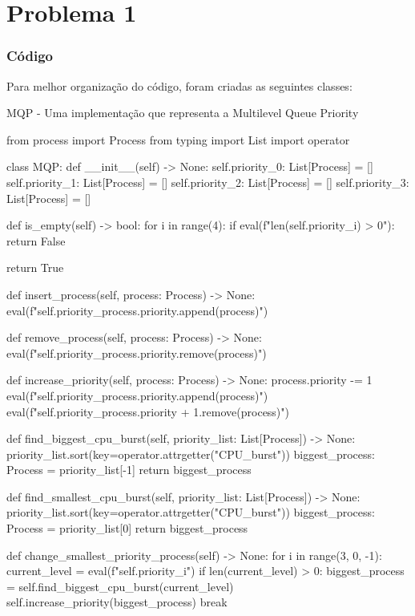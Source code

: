 \chapter{Problema 1}

\subsection*{Código}

Para melhor organização do código, foram criadas as seguintes classes:

MQP - Uma implementação que representa a Multilevel Queue Priority
\begin{python}
    from process import Process
    from typing import List
    import operator

    class MQP:
        def __init__(self) -> None:
            self.priority_0: List[Process] = []
            self.priority_1: List[Process] = []
            self.priority_2: List[Process] = []
            self.priority_3: List[Process] = []
            
        def is_empty(self) -> bool:
            for i in range(4):
                if eval(f"len(self.priority_{i}) > 0"):
                    return False
            
            return True

        
        def insert_process(self, process: Process) -> None:
            eval(f"self.priority_{process.priority}.append(process)")
        

        def remove_process(self, process: Process) -> None:
            eval(f"self.priority_{process.priority}.remove(process)")

        
        def increase_priority(self, process: Process) -> None:
            process.priority -= 1
            eval(f"self.priority_{process.priority}.append(process)")
            eval(f"self.priority_{process.priority + 1}.remove(process)")


        def find_biggest_cpu_burst(self, priority_list: List[Process]) -> None:
            priority_list.sort(key=operator.attrgetter("CPU_burst"))
            biggest_process: Process = priority_list[-1]
            return biggest_process
        
        def find_smallest_cpu_burst(self, priority_list: List[Process]) -> None:
            priority_list.sort(key=operator.attrgetter("CPU_burst"))
            biggest_process: Process = priority_list[0]
            return biggest_process


        def change_smallest_priority_process(self) -> None:
            for i in range(3, 0, -1):
                current_level = eval(f"self.priority_{i}")
                if len(current_level) > 0:
                    biggest_process = self.find_biggest_cpu_burst(current_level)
                    self.increase_priority(biggest_process)
                    break


\end{python}
